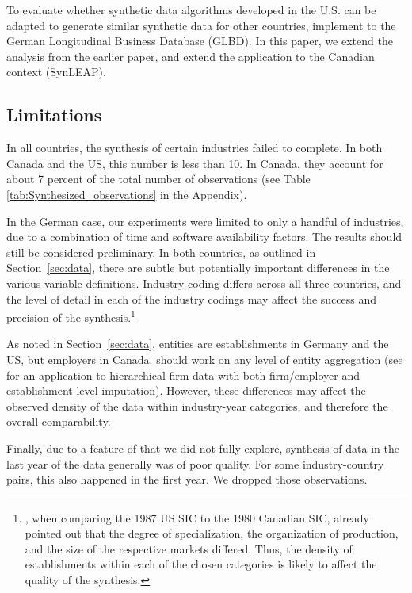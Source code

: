 To evaluate whether synthetic data algorithms developed in the U.S. can be adapted to generate similar synthetic data for other countries, \textcite{RePEc:cen:wpaper:14-13} implement \SynLBD{} to the German Longitudinal Business Database (GLBD). In this paper, we extend the analysis from the earlier paper, and extend the application to the Canadian context (SynLEAP). 

\subsection{Limitations}

In all countries, the synthesis of certain industries failed to complete. In both Canada and the US, this number is less than 10. In Canada, they account for about 7 percent of the total number of observations (see Table \ref{tab:Synthesized_observations} in the Appendix).

In the German case, our experiments were limited to only a handful of industries, due to a combination of time and software availability factors. The results should still be considered preliminary. In both countries, as outlined in Section~\ref{sec:data}, there are subtle but potentially important differences in the various variable definitions. Industry coding differs across all three countries, and the level of detail in each of the industry codings may affect the success and precision of the synthesis.\footnote{\textcite{StatisticsCanada1991}, when comparing the 1987 US \ac{SIC} to the 1980 Canadian \ac{SIC},  already pointed out that the degree of specialization, the organization of production, and the size of the respective markets differed. Thus, the density of establishments within each of the chosen categories is likely to affect the quality of the synthesis.} 

As noted in Section~\ref{sec:data}, entities are establishments in Germany and the US, but employers in Canada. \SynLBD{} should work on any level of entity aggregation (see \citet{RePEc:cen:wpaper:14-12} for an application to hierarchical firm data with both firm/employer and establishment level imputation). However, these differences may affect the observed density of the data within industry-year categories, and therefore the overall comparability. 

Finally, due to a feature of \SynLBD{} that we did not fully explore, synthesis of data in the last year of the data generally was of poor quality. For some industry-country pairs, this also happened in the first year. We dropped those observations. 


